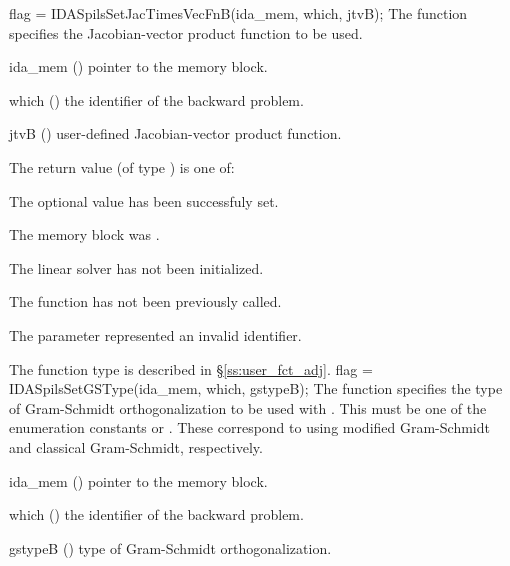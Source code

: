 {
  flag = IDASpilsSetJacTimesVecFnB(ida\_mem, which, jtvB);
}
{
  The function  specifies the Jacobian-vector 
  product function to be used.
}
{
  \begin{args}
  \item[ida\_mem] ()
    pointer to the {\idas} memory block.
  \item[which] ()
    the identifier of the backward problem.
  \item[jtvB] ()
    user-defined Jacobian-vector product function.
  \end{args}
}
{
  The return value  (of type ) is one of:
  \begin{args}
  \item[\Id{IDASPILS\_SUCCESS}] 
    The optional value has been successfuly set.
  \item[\Id{IDASPILS\_MEM\_NULL}]
    The  memory block was .
  \item[\Id{IDASPILS\_LMEM\_NULL}]
    The {\idaspgmr} linear solver has not been initialized.
  \item[\Id{IDASPILS\_NO\_ADJ}]
    The function  has not been previously called.
  \item[\Id{IDASPILS\_ILL\_INPUT}]
    The parameter  represented an invalid identifier.
  \end{args}
}
{
  The function type  is described in \S\ref{ss:user_fct_adj}.
}
{
  flag = IDASpilsSetGSType(ida\_mem, which, gstypeB);
}
{
  The function  specifies the type of
  Gram-Schmidt orthogonalization to be used with {\idaspgmr}.
  This must be one of the enumeration constants 
  or . These correspond to using modified Gram-Schmidt 
  and classical Gram-Schmidt, respectively. 
}
{
  \begin{args}[gstypeB]
  \item[ida\_mem] ()
    pointer to the {\idas} memory block.
  \item[which] ()
    the identifier of the backward problem.
  \item[gstypeB] ()
    type of Gram-Schmidt orthogonalization.
  \end{args}
}
